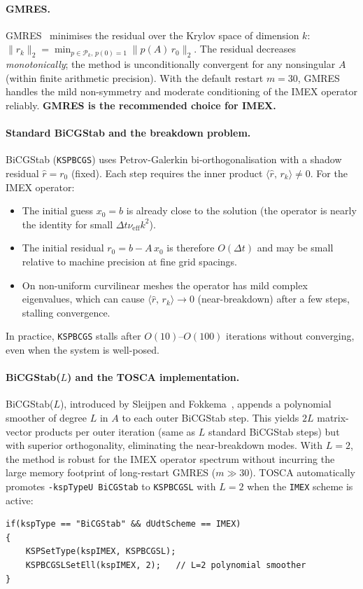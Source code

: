 \documentclass[12pt,a4paper]{article}
\newcommand{\dt}{\Delta t}
\begin{document}
	\paragraph{GMRES.}
	GMRES~\cite{Saad1986} minimises the residual over the Krylov space of dimension $k$:
	$\|r_k\|_2 = \min_{p \in \mathcal{P}_k,\,p(0)=1}\|p(A)\,r_0\|_2$.
	The residual decreases \emph{monotonically}; the method is
	unconditionally convergent for any nonsingular $A$ (within finite
	arithmetic precision). With the default restart $m=30$, GMRES
	handles the mild non-symmetry and moderate conditioning of the IMEX
	operator reliably. \textbf{GMRES is the recommended choice for IMEX.}

	\paragraph{Standard BiCGStab and the breakdown problem.}
	BiCGStab (\texttt{KSPBCGS}) uses Petrov-Galerkin bi-orthogonalisation
	with a shadow residual $\hat{r} = r_0$ (fixed).
	Each step requires the inner product $\langle\hat{r},\,r_k\rangle \neq 0$.
	For the IMEX operator:
	\begin{itemize}
		\item The initial guess $x_0 = b$ is already close to the solution
		      (the operator is nearly the identity for small $\dt\nu_\text{eff}k^2$).
		\item The initial residual $r_0 = b - A\,x_0$ is therefore $O(\dt)$ and
		      may be small relative to machine precision at fine grid spacings.
		\item On non-uniform curvilinear meshes the operator has mild complex eigenvalues,
		      which can cause $\langle\hat{r},\,r_k\rangle \to 0$ (near-breakdown)
		      after a few steps, stalling convergence.
	\end{itemize}
	In practice, \texttt{KSPBCGS} stalls after $O(10)$--$O(100)$ iterations
	without converging, even when the system is well-posed.

	\paragraph{BiCGStab($L$) and the TOSCA implementation.}
	BiCGStab($L$), introduced by Sleijpen and Fokkema~\cite{Sleijpen1993}, appends a polynomial
	smoother of degree $L$ in $A$ to each outer BiCGStab step.
	This yields $2L$ matrix-vector products per outer iteration (same as
	$L$ standard BiCGStab steps) but with superior orthogonality, eliminating
	the near-breakdown modes.
	With $L=2$, the method is robust for the IMEX operator spectrum
	without incurring the large memory footprint of long-restart GMRES
	($m \gg 30$).
	TOSCA automatically promotes \texttt{-kspTypeU BiCGStab} to
	\texttt{KSPBCGSL} with $L=2$ when the \texttt{IMEX} scheme is active:
	\begin{lstlisting}
if(kspType == "BiCGStab" && dUdtScheme == IMEX)
{
    KSPSetType(kspIMEX, KSPBCGSL);
    KSPBCGSLSetEll(kspIMEX, 2);   // L=2 polynomial smoother
}
	\end{lstlisting}
\end{document}
